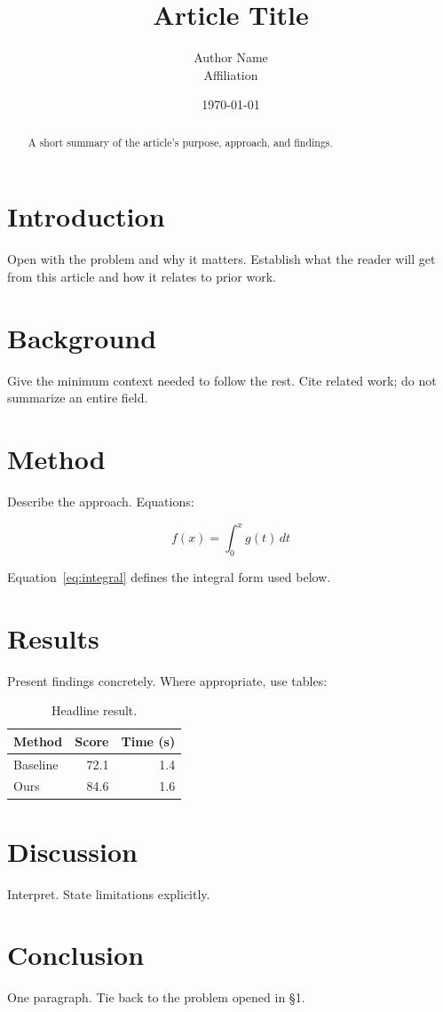 \documentclass[11pt,a4paper]{article}
\title{Article Title}
\author{Author Name \\ Affiliation}
\date{\today}
\begin{document}
\maketitle

\begin{abstract}
A short summary of the article's purpose, approach, and findings.
\end{abstract}

\section{Introduction}

Open with the problem and why it matters. Establish what the reader will get from this article and how it relates to prior work.

\section{Background}

Give the minimum context needed to follow the rest. Cite related work; do not summarize an entire field.

\section{Method}

Describe the approach. Equations:

\begin{equation}
  f(x) = \int_{0}^{x} g(t) \, dt
  \label{eq:integral}
\end{equation}

Equation~\ref{eq:integral} defines the integral form used below.

\section{Results}

Present findings concretely. Where appropriate, use tables:

\begin{table}[htbp]
  \centering
  \caption{Headline result.}
  \label{tab:result}
  \begin{tabular}{lrr}
    \toprule
    Method & Score & Time (s) \\
    \midrule
    Baseline & 72.1 & 1.4 \\
    Ours     & 84.6 & 1.6 \\
    \bottomrule
  \end{tabular}
\end{table}

\section{Discussion}

Interpret. State limitations explicitly.

\section{Conclusion}

One paragraph. Tie back to the problem opened in \S1.
\end{document}
